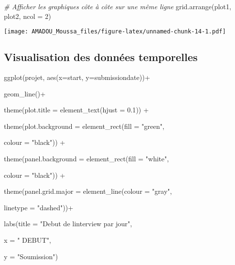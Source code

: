 \documentclass[
  14pt,
]{article}
\newenvironment{Shaded}{\begin{snugshade}}{\end{snugshade}}
\newcommand{\AttributeTok}[1]{\textcolor[rgb]{0.77,0.63,0.00}{#1}}
\newcommand{\CommentTok}[1]{\textcolor[rgb]{0.56,0.35,0.01}{\textit{#1}}}
\newcommand{\DecValTok}[1]{\textcolor[rgb]{0.00,0.00,0.81}{#1}}
\newcommand{\FloatTok}[1]{\textcolor[rgb]{0.00,0.00,0.81}{#1}}
\newcommand{\FunctionTok}[1]{\textcolor[rgb]{0.00,0.00,0.00}{#1}}
\newcommand{\NormalTok}[1]{#1}
\newcommand{\SpecialCharTok}[1]{\textcolor[rgb]{0.00,0.00,0.00}{#1}}
\newcommand{\StringTok}[1]{\textcolor[rgb]{0.31,0.60,0.02}{#1}}
\begin{document}
\begin{Shaded}
\begin{Highlighting}[]
\CommentTok{\# Afficher les graphiques côte à côte sur une même ligne}
\FunctionTok{grid.arrange}\NormalTok{(plot1, plot2, }\AttributeTok{ncol =} \DecValTok{2}\NormalTok{)}
\end{Highlighting}
\end{Shaded}

\texttt{[image: AMADOU\_Moussa\_files/figure-latex/unnamed-chunk-14-1.pdf]}

\hypertarget{visualisation-des-donnuxe9es-temporelles}{%
\subsection{\texorpdfstring{\textbf{Visualisation des données
temporelles}\\
}{Visualisation des données temporelles }}\label{visualisation-des-donnuxe9es-temporelles}}

\begin{Shaded}
\begin{Highlighting}[]
\FunctionTok{ggplot}\NormalTok{(projet, }
       \FunctionTok{aes}\NormalTok{(}\AttributeTok{x=}\NormalTok{start,}
           \AttributeTok{y=}\NormalTok{submissiondate))}\SpecialCharTok{+}
  
    \FunctionTok{geom\_line}\NormalTok{()}\SpecialCharTok{+} 
  
  \FunctionTok{theme}\NormalTok{(}\AttributeTok{plot.title =} \FunctionTok{element\_text}\NormalTok{(}\AttributeTok{hjust =} \FloatTok{0.1}\NormalTok{)) }\SpecialCharTok{+} 
  
  \FunctionTok{theme}\NormalTok{(}\AttributeTok{plot.background =} \FunctionTok{element\_rect}\NormalTok{(}\AttributeTok{fill =} \StringTok{"green"}\NormalTok{,}
                                       
                                       \AttributeTok{colour =} \StringTok{"black"}\NormalTok{)) }\SpecialCharTok{+} 
  
  \FunctionTok{theme}\NormalTok{(}\AttributeTok{panel.background =} \FunctionTok{element\_rect}\NormalTok{(}\AttributeTok{fill =} \StringTok{"white"}\NormalTok{,}
                                        
                                        \AttributeTok{colour =} \StringTok{"black"}\NormalTok{)) }\SpecialCharTok{+} 
  
  \FunctionTok{theme}\NormalTok{(}\AttributeTok{panel.grid.major =} \FunctionTok{element\_line}\NormalTok{(}\AttributeTok{colour =} \StringTok{"gray"}\NormalTok{, }
                                        
                                        \AttributeTok{linetype =} \StringTok{"dashed"}\NormalTok{))}\SpecialCharTok{+}
  
  \FunctionTok{labs}\NormalTok{(}\AttributeTok{title =} \StringTok{"Debut de l\textquotesingle{}interview par jour"}\NormalTok{,}
       
       \AttributeTok{x =} \StringTok{" DEBUT"}\NormalTok{,}
       
       \AttributeTok{y =} \StringTok{"Soumission"}\NormalTok{)}
\end{Highlighting}
\end{Shaded}
\end{document}
